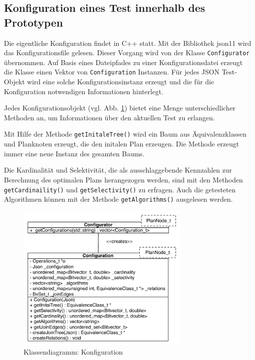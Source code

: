 \begin{minipage}{\linewidth}

\end{minipage}

\subsection{Konfiguration eines Test innerhalb des Prototypen}

Die eigentliche Konfiguration findet in C++ statt. Mit der Bibliothek json11 \cite{json11} wird das Konfigurationsfile gelesen. Dieser Vorgang wird von der Klasse \texttt{Config\-urator} übernommen. Auf Basis eines Dateipfades zu einer Konfigurationsdatei erzeugt die Klasse einen Vektor von \texttt{Configuration} Instanzen. Für jedes JSON Test-Objekt wird eine solche Konfigurationsinstanz erzeugt und die für die Konfiguration notwendigen Informationen hinterlegt.

Jedes Konfigurationsobjekt (vgl. Abb. \ref{Konfiguration}) bietet eine Menge unterschiedlicher Methoden an, um Informationen über den aktuellen Test zu erlangen.

Mit Hilfe der Methode \texttt{getInitaleTree()} wird ein Baum aus Äquivalenzklassen und Planknoten erzeugt, die den initalen Plan erzeugen. Die Methode erzeugt immer eine neue Instanz des gesamten Baums.

Die Kardinalität und Selektivität, die als ausschlaggebende Kennzahlen zur Berechnung des optimalen Plans herangezogen werden, sind mit den Methoden \texttt{get\-Cardinaility()} und \texttt{get\-Selectivity()} zu erfragen. Auch die getesteten Algorithmen können mit der Methode \texttt{getAlgorithms()} ausgelesen werden.


\begin{figure}[ht]
  \centering
  \includegraphics[width=0.75\textwidth]{04_Implementierung/00_media/ConfigurationClass.pdf}
  \caption{Klassendiagramm: Konfiguration}
  \label{Konfiguration}
\end{figure}
